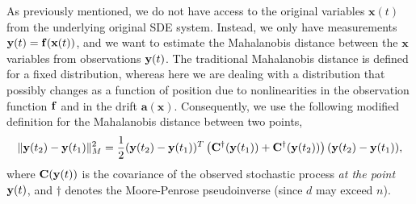 As previously mentioned, we do not have access to the original variables $\mathbf{x}(t)$ from the underlying original SDE system.
%
Instead, we only have measurements $\mathbf{y}(t) = \mathbf{f} (\mathbf{x}(t))$, and we want to estimate the Mahalanobis distance between the $\mathbf{x}$ variables from observations $\mathbf{y}(t)$.
%
The traditional Mahalanobis distance is defined for a fixed distribution,
whereas here we are dealing with a distribution that possibly changes as a function of position due to
nonlinearities in the observation function $\mathbf{f}$ and in the drift $\mathbf{a}(\mathbf{x})$.
%
Consequently, we use the following modified definition for the Mahalanobis distance between two points,
\begin{equation} \label{eq:mahalanobis_distance}
 \| \mathbf{y}(t_2) - \mathbf{y}(t_1) \|^2_M =
 \frac{1}{2} (\mathbf{y}(t_2) - \mathbf{y}(t_1))^T \left( \mathbf{C}^{\dagger}(\mathbf{y}(t_1)) + \mathbf{C}^{\dagger}(\mathbf{y}(t_2)) \right) (\mathbf{y}(t_2) - \mathbf{y}(t_1)),
 \end{equation}
where $\mathbf{C}(\mathbf{y}(t))$ is the covariance of the observed stochastic process {\em at the point} $\mathbf{y}(t)$,
%
and $\dagger$ denotes the Moore-Penrose pseudoinverse (since $d$ may exceed $n$).

